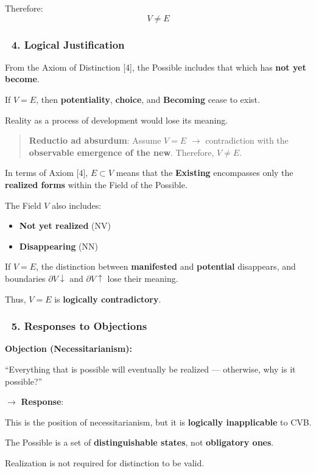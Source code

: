 \documentclass[12pt]{article}
\begin{document}
Therefore:
\[
V \neq E
\]

\subsubsection*{🔹 4. Logical Justification}
From the Axiom of Distinction [4], the Possible includes that which has \textbf{not yet become}.

If $V = E$, then \textbf{potentiality}, \textbf{choice}, and \textbf{Becoming} cease to exist.

Reality as a process of development would lose its meaning.

\begin{quote}
\textbf{Reductio ad absurdum}: Assume $V = E$ $\rightarrow$ contradiction with the \textbf{observable emergence of the new}. Therefore, $V \neq E$.
\end{quote}

In terms of Axiom [4], $E \subset V$ means that the \textbf{Existing} encompasses only the \textbf{realized forms} within the Field of the Possible.

The Field $V$ also includes:
\begin{itemize}
\item \textbf{Not yet realized} (NV)
\item \textbf{Disappearing} (NN)
\end{itemize}

If $V = E$, the distinction between \textbf{manifested} and \textbf{potential} disappears, and boundaries $\partial V\downarrow$ and $\partial V\uparrow$ lose their meaning.

Thus, $V = E$ is \textbf{logically contradictory}.

\subsubsection*{🔹 5. Responses to Objections}
\textbf{Objection (Necessitarianism):}

``Everything that is possible will eventually be realized — otherwise, why is it possible?''

$\rightarrow$ \textbf{Response}:

This is the position of necessitarianism, but it is \textbf{logically inapplicable} to CVB.

The Possible is a set of \textbf{distinguishable states}, not \textbf{obligatory ones}.

Realization is not required for distinction to be valid.
\end{document}
